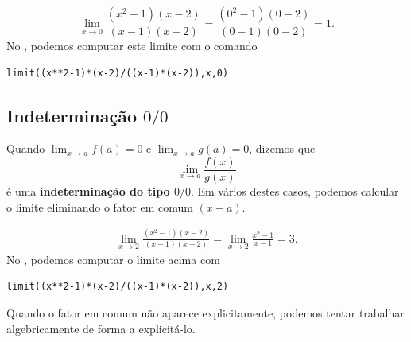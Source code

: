 \begin{ex}
  \begin{equation}
    \lim_{x\to 0} \frac{(x^2-1)(x-2)}{(x-1)(x-2)} = \frac{(0^2-1)(0-2)}{(0-1)(0-2)} = 1.
  \end{equation}
  \ifispython
  No \sympy, podemos computar este limite com o comando
\begin{verbatim}
limit((x**2-1)*(x-2)/((x-1)*(x-2)),x,0)
\end{verbatim}
  \fi
\end{ex}

\subsection{Indeterminação $0/0$}

Quando $\displaystyle \lim_{x\to a} f(a)=0$ e $\displaystyle \lim_{x\to a} g(a)=0$, dizemos que
\begin{equation}
  \lim_{x\to a} \frac{f(x)}{g(x)}
\end{equation}
é uma {\bf indeterminação do tipo $0/0$}. Em vários destes casos, podemos calcular o limite eliminando o fator em comum $(x-a)$.

\begin{ex}
  \begin{align}
    \lim_{x\to 2}\frac{(x^2-1)(x-2)}{(x-1)(x-2)} = \lim_{x\to 2} \frac{x^2-1}{x-1} = 3.
  \end{align}
  \ifispython
  No \sympy, podemos computar o limite acima com
\begin{verbatim}
limit((x**2-1)*(x-2)/((x-1)*(x-2)),x,2)
\end{verbatim}
  \fi
\end{ex}

Quando o fator em comum não aparece explicitamente, podemos tentar trabalhar algebricamente de forma a explicitá-lo.

